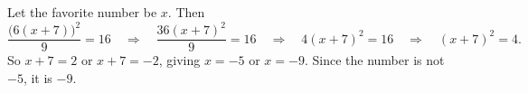 Let the favorite number be $x$. Then
\[
\dfrac{\bigl(6(x+7)\bigr)^2}{9}=16 \quad\Longrightarrow\quad \dfrac{36(x+7)^2}{9}=16 \quad\Longrightarrow\quad 4(x+7)^2=16 \quad\Longrightarrow\quad (x+7)^2=4 .
\]
So $x+7=2$ or $x+7=-2$, giving $x=-5$ or $x=-9$. Since the number is not $-5$, it is $\boxed{-9}$.
